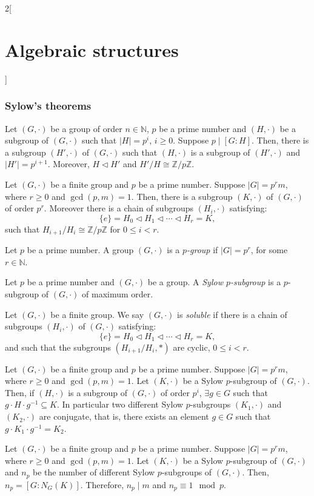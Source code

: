 \documentclass[../../../main.tex]{subfiles}
\begin{document}
\begin{multicols}{2}[\section{Algebraic structures}]
\subsubsection*{Sylow's theorems}
\begin{corollary}
    Let $(G,\cdot)$ be a group of order $n\in\mathbb{N}$, $p$ be a prime number and $(H,\cdot)$ be a subgroup of $(G,\cdot)$ such that $|H|=p^i$, $i\geq 0$. Suppose $p\mid[G:H]$. Then, there is a subgroup $(H',\cdot)$ of $(G,\cdot)$ such that $(H,\cdot)$ is a subgroup of $(H',\cdot)$ and $|H'|=p^{i+1}$. Moreover, $H\lhd H'$ and $H'/H\cong\mathbb{Z}/p\mathbb{Z}$.
\end{corollary}
\begin{theorem}
    Let $(G,\cdot)$ be a finite group and $p$ be a prime number. Suppose $|G|=p^r m$, where $r\geq 0$ and $\gcd(p,m)=1$. Then, there is a subgroup $(K,\cdot)$ of $(G,\cdot)$ of order $p^r$. Moreover there is a chain of subgroups $(H_i,\cdot)$ satisfying: $$\{e\}=H_0\lhd H_1\lhd\cdots\lhd H_r=K,$$ such that $H_{i+1}/H_i\cong\mathbb{Z}/p\mathbb{Z}$ for $0\leq i<r$.
\end{theorem}
\begin{definition}
    Let $p$ be a prime number. A group $(G,\cdot)$ is a \textit{$p$-group} if $|G|=p^r$, for some $r\in\mathbb{N}$.
\end{definition}
\begin{definition}
    Let $p$ be a prime number and $(G,\cdot)$ be a group. A \textit{Sylow $p$-subgroup} is a $p$-subgroup of $(G,\cdot)$ of maximum order.
\end{definition}
\begin{definition}
    Let $(G,\cdot)$ be a finite group. We say $(G,\cdot)$ is \textit{soluble} if there is a chain of subgroups $(H_i,\cdot)$ of $(G,\cdot)$ satisfying: $$\{e\}=H_0\lhd H_1\lhd\cdots\lhd H_r=K,$$ and such that the subgroups $(H_{i+1}/H_i,*)$ are cyclic, $0\leq i<r$. 
\end{definition}
\begin{theorem}
    Let $(G,\cdot)$ be a finite group and $p$ be a prime number. Suppose $|G|=p^r m$, where $r\geq 0$ and $\gcd(p,m)=1$. Let $(K,\cdot)$ be a Sylow $p$-subgroup of $(G,\cdot)$. Then, if $(H,\cdot)$ is a subgroup of $(G,\cdot)$ of order $p^i$, $\exists g\in G$ such that $g\cdot H\cdot g^{-1}\subseteq K$. In particular two different Sylow $p$-subgroups $(K_1,\cdot)$ and $(K_2,\cdot)$ are conjugate, that is, there exists an element $g\in G$ such that $g\cdot K_1\cdot g^{-1}=K_2$.
\end{theorem}
\begin{theorem}
    Let $(G,\cdot)$ be a finite group and $p$ be a prime number. Suppose $|G|=p^r m$, where $r\geq 0$ and $\gcd(p,m)=1$. Let $(K,\cdot)$ be a Sylow $p$-subgroup of $(G,\cdot)$ and $n_p$ be the number of different Sylow $p$-subgroups of $(G,\cdot)$. Then, $n_p=[G:N_G(K)]$. Therefore, $n_p\mid m$ and $n_p\equiv1\mod p$. 
\end{theorem}

\end{multicols}
\end{document}
